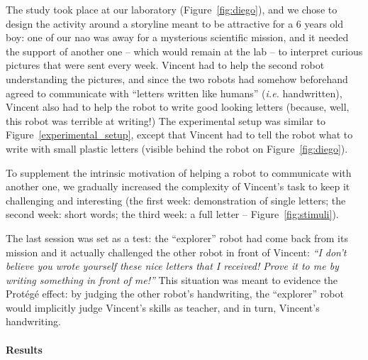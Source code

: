 \documentclass{article}
\newcommand{\ie}{\textit{i.e.}\xspace}
\begin{document}
The study took place at our laboratory (Figure~\ref{fig:diego}), and we chose to
design the activity around a storyline meant to be attractive for a 6 years old
boy: one of our {\sc nao} was away for a mysterious scientific mission, and it
needed the support of another one -- which would remain at the lab -- to
interpret curious pictures that were sent every week. Vincent had to help the
second robot understanding the pictures, and since the two robots had somehow
beforehand agreed to communicate with ``letters written like humans'' (\ie
handwritten), Vincent also had to help the robot to write good looking letters
(because, well, this robot was terrible at writing!) The experimental setup was
similar to Figure~\ref{experimental_setup}, except that Vincent had to tell the
robot what to write with small plastic letters (visible behind the robot on
Figure~\ref{fig:diego}).

To supplement the intrinsic motivation of helping a robot to communicate with
another one, we gradually increased the complexity of Vincent's task to keep it
challenging and interesting (the first week: demonstration of single letters;
the second week: short words; the third week: a full letter --
Figure~\ref{fig:stimuli}).

The last session was set as a test: the ``explorer'' robot had come back from
its mission and it actually challenged the other robot in front of Vincent:
\emph{``I don't believe you wrote yourself these nice letters that I received!
Prove it to me by writing something in front of me!''} This situation was meant
to evidence the Protégé effect: by judging the other robot's handwriting, the
``explorer'' robot would implicitly judge Vincent's skills as teacher, and in
turn, Vincent's handwriting.

\paragraph{Results}
\end{document}
